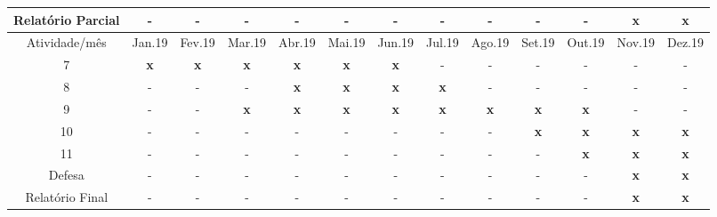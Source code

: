 \documentclass[12pt]{article}
\begin{document}
\begin{table}[ht!]
\begin{center}
{\begin{tabular}{c ccc ccc ccc ccc}
    \small Relatório Parcial
    & \small - & \small - & \small - & \small -  
    & \small - & \small - & \small - & \small -
    & \small - & \small - & \small {\bf x} & \small {\bf x} \\ 


    \bottomrule
    \toprule
    \small Atividade/mês & \small Jan.19 & \small Fev.19 & \small Mar.19
                         & \small Abr.19 & \small Mai.19 & \small Jun.19
                         & \small Jul.19 & \small Ago.19 & \small Set.19
                         & \small Out.19 & \small Nov.19 & \small Dez.19

    \\ \hline
    
    \small 7
    & \small {\bf x} & \small {\bf x} & \small {\bf x} & {\bf x}
    & \small {\bf x} & \small {\bf x} & \small - & \small -
    & \small - & \small - & \small - & \small - \\ 

    \small 8
    & \small - & \small - & \small - & \small {\bf x}
    & \small {\bf x} & \small {\bf x} & \small {\bf x} & \small -
    & \small - & \small - & \small - & \small - \\ 

    \small 9
    & \small - & \small - & \small {\bf x} & \small {\bf x}  
    & \small {\bf x} & \small {\bf x} & \small {\bf x} & \small {\bf x}
    & \small {\bf x} & \small {\bf x} & \small - & \small - \\ 

    \small 10
    & \small - & \small - & \small - & \small -  
    & \small - & \small - & \small - & \small -
    & \small {\bf x} & \small {\bf x} & \small {\bf x} & \small {\bf x} \\ 


    \small 11 
    & \small - & \small - & \small - & \small -  
    & \small - & \small - & \small - & \small -
    & \small - & \small {\bf x} & \small {\bf x} & \small {\bf x} \\ 


    \small Defesa
    & \small - & \small - & \small - & \small -  
    & \small - & \small - & \small - & \small -
    & \small - & \small - & \small {\bf x} & \small {\bf x} \\ 
   

    \small Relatório Final
    & \small - & \small - & \small - & \small -  
    & \small - & \small - & \small - & \small -
    & \small - & \small - & \small {\bf x} & \small {\bf x} \\ 


    \bottomrule


\end{tabular}
}
\end{center}
\end{table}
\end{document}
